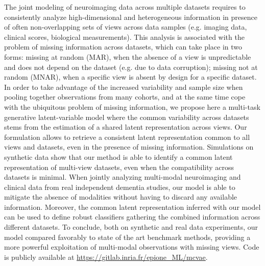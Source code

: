 The joint modeling of neuroimaging data across multiple datasets requires to consistently analyze high-dimensional and heterogeneous information in presence of often non-overlapping sets of views across data samples (e.g. imaging data, clinical scores, biological measurements).
This analysis is associated with the problem of missing information across datasets, which can take place in two forms:
missing at random (MAR), when the absence of a view is unpredictable and does not depend on the dataset (e.g. due to data corruption);
missing not at random (MNAR), when a specific view is absent by design for a specific dataset.
%
In order to take advantage of the increased variability and sample size when pooling together observations from many cohorts,
and at the same time cope with the ubiquitous problem of missing information,
we propose here a multi-task generative latent-variable model where the common variability across datasets stems from the estimation of a shared latent representation across views.
Our formulation allows to retrieve a consistent latent representation common to all views and datasets, even in the presence of missing information.
%
Simulations on synthetic data show that our method is able to identify a common latent representation of multi-view datasets, even when the compatibility across datasets is minimal.
%
When jointly analyzing multi-modal neuroimaging and clinical data from real independent dementia studies, our model is able to mitigate the absence of modalities without having to discard any available information.
Moreover, the common latent representation inferred with our model can be used to define robust classifiers gathering the combined information across different datasets.
%
To conclude, both on synthetic and real data experiments, our model compared favorably to state of the art benchmark methods, providing a more powerful exploitation of multi-modal observations with missing views.
%
Code is publicly available at \url{https://gitlab.inria.fr/epione\_ML/mcvae}.
